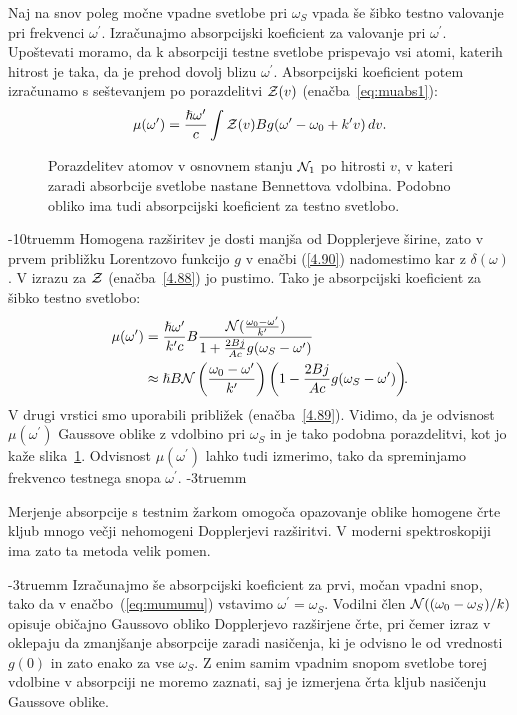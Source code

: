 Naj na snov poleg močne vpadne svetlobe pri $\omega_S$ vpada še šibko testno valovanje pri 
frekvenci $\omega^{\prime}$. Izračunajmo absorpcijski koeficient za valovanje pri $\omega^\prime$. 
Upoštevati moramo, da k absorpciji testne svetlobe prispevajo vsi atomi, katerih
hitrost je taka, da je prehod dovolj blizu $\omega^{\prime}$. 
Absorpcijski 
koeficient potem izračunamo s seštevanjem 
po porazdelitvi ${\cal Z}(v)$
(enačba~\ref{eq:muabs1}):
\begin{equation}
\mu(\omega^{\prime})=\frac{\hslash\omega^{\prime}}{c}\int{\cal Z}(v)Bg(\omega^{\prime}-\omega_{0}+k'v)\, dv.
\label{4.90}
\end{equation}
\begin{figure}[ht]
\centering
\def\svgwidth{80truemm} 

\caption{Porazdelitev atomov v osnovnem stanju ${\cal N}_1$ po hitrosti $v$, v kateri zaradi
absorbcije svetlobe nastane Bennettova vdolbina. Podobno obliko ima 
tudi absorpcijski koeficient za testno svetlobo.}
\label{fig:Bennet}
\end{figure}
\vglue-10truemm
Homogena razširitev je dosti manjša od Dopplerjeve širine, zato
v prvem približku Lorentzovo funkcijo $g$ v enačbi (\ref{4.90}) nadomestimo kar z
$\delta(\omega)$. V izrazu za $\cal Z$ (enačba~\ref{4.88}) jo pustimo. 
Tako je absorpcijski koeficient za šibko testno svetlobo:
\begin{align}
\label{eq:mumumu}
\mu(\omega^{\prime}) & =  \frac{\hslash\omega^{\prime}}{k'c}B\frac{{\cal N}
(\frac{\omega_0-\omega'}{k'})}{1+\frac{2Bj}{Ac}g(\omega_S-\omega')} \nonumber \\  
 & \approx  \hslash B{\cal N}\left(\frac{\omega_0-\omega'}{k'}\right)\left(1-\frac{2Bj}{Ac}g(\omega_S-\omega')\right)\!\!.
\end{align}
V drugi vrstici smo uporabili približek (enačba~\ref{4.89}). Vidimo, da je 
odvisnost $\mu(\omega^{\prime})$ Gaussove oblike z vdolbino pri $\omega_S$ in je tako
podobna porazdelitvi, kot jo kaže slika~\ref{fig:Bennet}. Odvisnost 
$\mu(\omega^{\prime})$ lahko tudi izmerimo, tako da spreminjamo 
frekvenco testnega snopa $\omega^{\prime}$.
\vglue-3truemm
\begin{remark}
 Merjenje absorpcije s testnim
žarkom omogoča opazovanje oblike homogene črte kljub mnogo večji
nehomogeni Dopplerjevi razširitvi. V moderni spektroskopiji ima zato ta metoda
velik pomen.
\end{remark}
\vglue-3truemm
Izračunajmo še absorpcijski koeficient za prvi, močan vpadni snop, tako da v
enačbo~(\ref{eq:mumumu}) vstavimo $\omega^{\prime}=\omega_S$. Vodilni člen ${\cal N}((\omega_0-
\omega_S)/k)$ opisuje običajno Gaussovo obliko Dopplerjevo
razširjene črte, pri čemer izraz v oklepaju da zmanjšanje absorpcije
zaradi nasičenja, ki je odvisno le od vrednosti $g(0)$ in zato enako za vse $\omega_S$. 
Z enim samim vpadnim snopom svetlobe torej vdolbine v absorpciji ne moremo zaznati, saj 
je izmerjena črta kljub nasičenju Gaussove oblike. 


